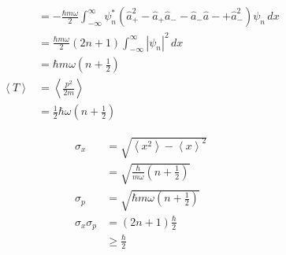 \documentclass{article}
\newcommand{\ev}[1]{\left< #1 \right>}
\begin{document}
\begin{align*}
           & = -\frac{\hbar m \omega}{2} \int_{-\infty}^\infty \psi_n^* (\hat{a}_+^2 - \hat{a}_+ \hat{a}_- - \hat{a}_- \hat{a}- + \hat{a}_-^2) \psi_n \,d x \\
           & = \frac{\hbar m \omega}{2} (2 n + 1) \int_{-\infty}^\infty |\psi_n|^2 \,d x                                                                    \\
           & = \hbar m \omega \left( n + \frac{1}{2} \right)                                                                                                \\
  \ev{T}   & = \ev{\frac{p^2}{2 m}}                                                                                                                         \\
           & = \frac{1}{2} \hbar \omega \left( n + \frac{1}{2} \right)
\end{align*}

\begin{align*}
  \sigma_x          & = \sqrt{\ev{x^2} - \ev{x}^2}                                   \\
                    & = \sqrt{\frac{\hbar}{m \omega} \left( n + \frac{1}{2} \right)} \\
  \sigma_p          & = \sqrt{\hbar m \omega \left( n + \frac{1}{2} \right)}         \\
  \sigma_x \sigma_p & = (2 n + 1) \frac{\hbar}{2}                                    \\
                    & \ge \frac{\hbar}{2}
\end{align*}

\subsection{}
\end{document}
